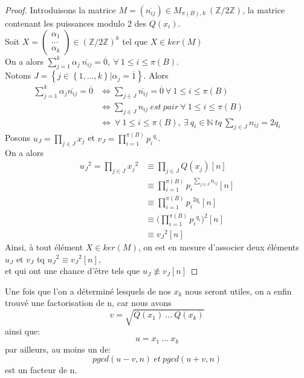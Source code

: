 \begin{proof}
    Introduisons la matrice $M = (\overline{n_{ij}}) \in M_{\pi(B),k} ~ (\mathbb{Z}/2\mathbb{Z})$, la matrice contenant les puissances modulo 2 des $Q(x_i)$.\\
    Soit $X = 
    \begin{pmatrix}
        \alpha_1 \\ ... \\ \alpha_k
    \end{pmatrix}
    \in (\mathbb{Z}/2\mathbb{Z})^k$ tel que $X \in ker(M)$\\
    On a alors $\sum\limits_{j=1}^k {\alpha_j ~ \overline{n_{ij}}} = \overline{0}, ~ \forall ~ 1 \leq i \leq \pi(B)$.\\
    Notons $J = \left\{ j \in \left\{1, ..., k\right\} | \alpha_j = \overline{1} \right\}.$
    Alors \begin{align*}
        \sum\limits_{j=1}^k {\alpha_j \overline{n_{ij}}} = \overline{0} &\Longleftrightarrow \sum\limits_{j\in J} {\overline{n_{ij}}} = \overline{0} ~ \forall ~ 1 \leq i \leq \pi(B)\\
        &\Longleftrightarrow \sum\limits_{j\in J} {n_{ij}} ~ est ~ pair ~ \forall ~ 1 \leq i \leq \pi(B)\\
        &\Longleftrightarrow ~ \forall ~ 1 \leq i \leq \pi(B), ~ \exists ~ q_i \in \mathbb{N} ~ tq ~ \sum\limits_{j \in J} {n_{ij}} = 2 q_i
    \end{align*}
    Posons $u_J = \prod\limits_{j \in J} {x_j}$ et $v_J = \prod\limits_{i=1}^{\pi(B)} {{p_i}^{q_i}}$.\\
    On a alors 
    \begin{align*}
        {u_J}^2 = \prod\limits_{j\in J} {{x_j}^2} &\equiv \prod\limits_{j\in J} {Q(x_j) [n]}\\
        &\equiv \prod\limits_{i=1}^{\pi(B)} {{p_i}^{\sum\limits_{j \in J} {n_{ij}}} [n]}\\
        &\equiv \prod\limits_{i=1}^{\pi(B)} {{p_i}^{2q_i} [n]}\\
        &\equiv (\prod\limits_{i=1}^{\pi(B)} {{p_i}^{q_i})^2 [n]}\\
        &\equiv {v_J}^2 [n]
    \end{align*}
    Ainsi, à tout élément $X \in ker(M)$, on est en mesure d'associer deux éléments $u_J$ et $v_J$ tq ${u_J}^2 \equiv {v_J}^2 [n],$\\
    et qui ont une chance d'être tels que $u_J \not\equiv v_J [n]$
\end{proof}

Une fois que l'on a déterminé lesquels de nos $x_k$ nous seront utiles, on a enfin trouvé une factorisation de n, car nous avons \[v = \sqrt{Q(x_1) ~ ... ~ Q(x_k)}\] ainsi que: \[u = x_1 ~ ... ~ x_k\]
par ailleurs, au moins un de: \[pgcd(u - v, n) ~ et ~ pgcd(u + v, n)\] est un facteur de n. \\

